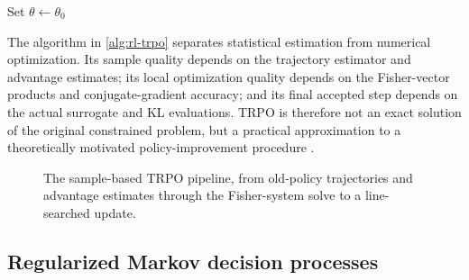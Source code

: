 \begin{algorithm}[H]
\caption{Sample-based trust-region policy optimization}
\label{alg:rl-trpo}
Set $\theta\leftarrow\theta_0$\;
\end{algorithm}

The algorithm in \cref{alg:rl-trpo} separates statistical estimation from
numerical optimization. Its sample quality depends on the trajectory estimator
and advantage estimates; its local optimization quality depends on the
Fisher-vector products and conjugate-gradient accuracy; and its final accepted
step depends on the actual surrogate and KL evaluations. TRPO is therefore not
an exact solution of the original constrained problem, but a practical
approximation to a theoretically motivated policy-improvement procedure
\parencite{schulman2015trpo}.

\begin{figure}[htbp]
    \centering
    \resizebox{\textwidth}{!}{}
    \caption{The sample-based TRPO pipeline, from old-policy trajectories and advantage
    estimates through the Fisher-system solve to a line-searched update.}
    \label{fig:rl-trpo-geometry}
\end{figure}

\subsection{Regularized Markov decision processes}
\label{subsec:rl-regularized-mdps}

